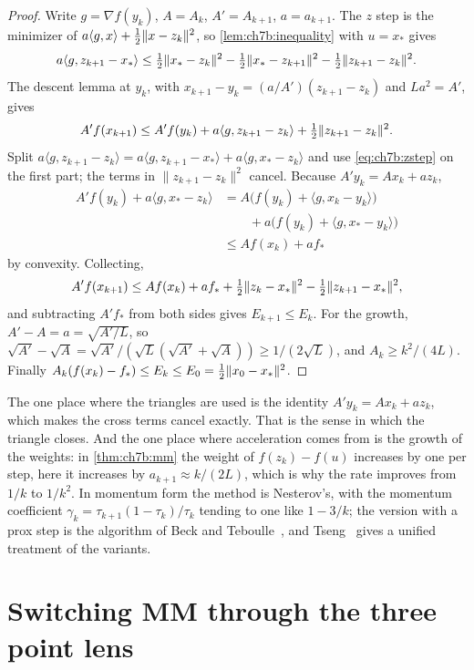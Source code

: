 \begin{proof}
Write $g=\nabla f(y_k)$, $A=A_k$, $A'=A_{k+1}$, $a=a_{k+1}$. The $z$ step is the
minimizer of $a\langle g,x\rangle+\tfrac{1}{2}\|x-z_k\|^2$, so \cref{lem:ch7b:inequality}
with $u=x_*$ gives
\begin{equation}\label{eq:ch7b:zstep}
  a\langle g,z_{k+1}-x_*\rangle\le\tfrac{1}{2}\|x_*-z_k\|^2-\tfrac{1}{2}\|x_*-z_{k+1}\|^2-\tfrac{1}{2}\|z_{k+1}-z_k\|^2.
\end{equation}
The descent lemma at $y_k$, with $x_{k+1}-y_k=(a/A')(z_{k+1}-z_k)$ and
$La^2=A'$, gives
\[
  A'f(x_{k+1})\le A'f(y_k)+a\langle g,z_{k+1}-z_k\rangle+\tfrac{1}{2}\|z_{k+1}-z_k\|^2.
\]
Split $a\langle g,z_{k+1}-z_k\rangle=a\langle g,z_{k+1}-x_*\rangle+a\langle g,x_*-z_k\rangle$
and use \eqref{eq:ch7b:zstep} on the first part; the terms in
$\|z_{k+1}-z_k\|^2$ cancel. Because $A'y_k=Ax_k+az_k$,
\begin{align*}
  A'f(y_k)+a\langle g,x_*-z_k\rangle
  &=A\bigl(f(y_k)+\langle g,x_k-y_k\rangle\bigr)\\
  &\qquad+a\bigl(f(y_k)+\langle g,x_*-y_k\rangle\bigr)\\
  &\le Af(x_k)+af_*
\end{align*}
by convexity. Collecting,
\[
  A'f(x_{k+1})\le Af(x_k)+af_*+\tfrac{1}{2}\|z_k-x_*\|^2-\tfrac{1}{2}\|z_{k+1}-x_*\|^2,
\]
and subtracting $A'f_*$ from both sides gives $E_{k+1}\le E_k$. For the growth,
$A'-A=a=\sqrt{A'/L}$, so $\sqrt{A'}-\sqrt A=\sqrt{A'}/(\sqrt L(\sqrt{A'}+\sqrt A))\ge1/(2\sqrt L)$,
and $A_k\ge k^2/(4L)$. Finally $A_k(f(x_k)-f_*)\le E_k\le E_0=\tfrac{1}{2}\|x_0-x_*\|^2$.
\end{proof}

The one place where the triangles are used is the identity $A'y_k=Ax_k+az_k$,
which makes the cross terms cancel exactly. That is the sense in which the
triangle closes. And the one place where acceleration comes from is the
growth of the weights: in \cref{thm:ch7b:mm} the weight of $f(z_k)-f(u)$
increases by one per step, here it increases by $a_{k+1}\approx k/(2L)$, which
is why the rate improves from $1/k$ to $1/k^2$. In momentum form the method
is Nesterov's, with the momentum coefficient $\gamma_k=\tau_{k+1}(1-\tau_k)/\tau_k$ tending to one like
$1-3/k$; the version with a prox step is the algorithm of Beck and
Teboulle~\cite{beck2009}, and Tseng~\cite{tseng2008} gives a unified treatment
of the variants.

\section{Switching MM through the three point lens}\label{sec:ch7b:smm}

